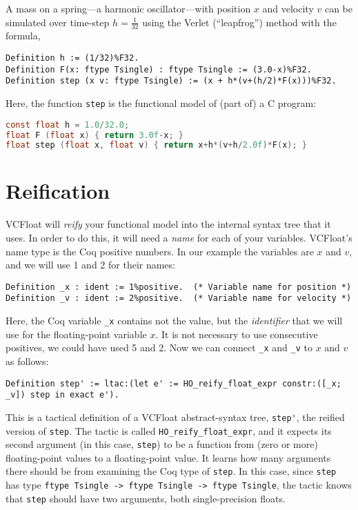 \documentclass[article]{memoir}
\begin{document}
A mass on a spring---a harmonic oscillator---with position $x$ and
velocity $v$ can be simulated over time-step $h=\frac{1}{32}$ using the
Verlet (``leapfrog'') method with the formula,

\begin{lstlisting}
Definition h := (1/32)%F32.
Definition F(x: ftype Tsingle) : ftype Tsingle := (3.0-x)%F32.  
Definition step (x v: ftype Tsingle) := (x + h*(v+(h/2)*F(x)))%F32.
\end{lstlisting}

Here, the function \lstinline{step} is the functional model of
(part of) a C program:

\begin{lstlisting}[language=C]
const float h = 1.0/32.0;
float F (float x) { return 3.0f-x; }
float step (float x, float v) { return x+h*(v+h/2.0f)*F(x); }
\end{lstlisting}

\chapter{Reification}

VCFloat will \emph{reify} your functional model into the internal
syntax tree that it uses.  In order to do this, it will need
a \emph{name} for each of your variables.
VCFloat's name type is the Coq positive numbers.
In our example the variables are $x$ and $v$, and
we will use 1 and 2 for their names:

\begin{lstlisting}
Definition _x : ident := 1%positive.  (* Variable name for position *)
Definition _v : ident := 2%positive.  (* Variable name for velocity *)
\end{lstlisting}

Here, the Coq variable \lstinline{_x} contains not the value,
but the \emph{identifier} that we will use for the floating-point
variable $x$.  It is not necessary to use consecutive positives,
we could have used 5 and 2.
Now we can connect \lstinline{_x} and
\lstinline{_v} to $x$ and $v$ as follows:

\begin{lstlisting}
Definition step' := ltac:(let e' := HO_reify_float_expr constr:([_x; _v]) step in exact e').
\end{lstlisting}

This is a tactical definition of a VCFloat abstract-syntax tree,
\lstinline{step'}, the reified version of \lstinline{step}.
The tactic is called \lstinline{HO_reify_float_expr},
and it expects its second argument (in this case, \lstinline{step})
to be a function from (zero or more) floating-point values
to a floating-point value.  It learns how many arguments
there should be from examining the Coq type of \lstinline{step}.
In this case, since \lstinline{step} has type
\lstinline{ftype Tsingle -> ftype Tsingle -> ftype Tsingle},
the tactic knows that \lstinline{step} should have
two arguments, both single-precision floats.
\end{document}
